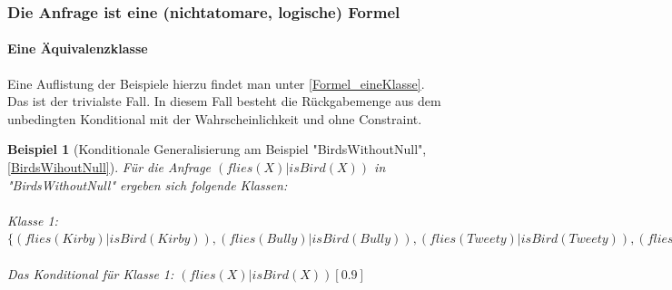 \documentclass[a4paper, 11pt]{book}
\newtheorem{Bsp}{Beispiel}[section]
\begin{document}
\subsubsection{Die Anfrage ist eine (nichtatomare, logische) Formel} \label{KondGen_Formel}
\paragraph{Eine Äquivalenzklasse}
Eine Auflistung der Beispiele hierzu findet man unter \ref{Formel_eineKlasse}.\\
Das ist der trivialste Fall. In diesem Fall besteht die Rückgabemenge aus dem unbedingten Konditional mit der Wahrscheinlichkeit und ohne Constraint.
	\begin{Bsp}[Konditionale Generalisierung am Beispiel "{}BirdsWithoutNull"{}, \ref{BirdsWihoutNull}]
	Für die Anfrage $ (flies(X) | isBird(X))$ in "{}BirdsWithoutNull"{} ergeben sich folgende Klassen:\\
	\\
	Klasse 1: $ \{(flies(Kirby) | isBird(Kirby)), (flies(Bully) | isBird(Bully)), (flies(Tweety) | isBird(Tweety)), (flies(Sylvester) | isBird(Sylvester))\} $\\
	\\
	Das Konditional für Klasse 1: $ (flies(X) | isBird(X))[0.9]$
\end{Bsp}
\end{document}

